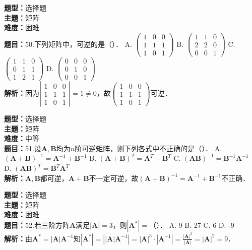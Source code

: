 \documentclass{ctexart}
\newenvironment{question}[5]{%
	\noindent\textbf{题型：}#1\\
	\textbf{主题：}#2\\
	\textbf{难度：}#3\\
	\textbf{题目：}#4\\
	\textbf{解析：}#5\\
	\vspace{1em}
}{}
\begin{document}
	\begin{question}
		{选择题}
		{矩阵}
		{困难}
		{50.下列矩阵中，可逆的是（）．
			A. \(\left(\begin{array}{lll}1 & 0 & 0 \\ 1 & 1 & 1 \\ 1 & 0 & 1\end{array}\right)\)
			B. \(\left(\begin{array}{lll}1 & 1 & 0 \\ 2 & 2 & 0 \\ 0 & 0 & 1\end{array}\right)\)
			C. \(\left(\begin{array}{lll}1 & 1 & 0 \\ 0 & 1 & 1 \\ 1 & 2 & 1\end{array}\right)\)
			D. \(\left(\begin{array}{lll}0 & 0 & 0 \\ 0 & 1 & 0 \\ 0 & 0 & 1\end{array}\right)\)}
		{因为\(\left|\begin{array}{lll}1 & 0 & 0 \\ 1 & 1 & 1 \\ 1 & 0 & 1\end{array}\right|=1 \neq 0\)，故\(\left(\begin{array}{lll}1 & 0 & 0 \\ 1 & 1 & 1 \\ 1 & 0 & 1\end{array}\right)\)可逆．}
	\end{question}
	
	\begin{question}
		{选择题}
		{矩阵}
		{中等}
		{51.设\(\mathbf{A}, \mathbf{B}\)均为\(n\)阶可逆矩阵，则下列各式中不正确的是（）．
			A. \((\mathbf{A}+\mathbf{B})^{-1}=\mathbf{A}^{-1}+\mathbf{B}^{-1}\)
			B. \((\mathbf{A}+\mathbf{B})^T=\mathbf{A}^T+\mathbf{B}^T\)
			C. \((\mathbf{A B})^{-1}=\mathbf{B}^{-1} \mathbf{A}^{-1}\)
			D. \((\mathbf{A B})^T=\mathbf{B}^T \mathbf{A}^T\)}
		{\(\mathbf{A}, \mathbf{B}\)都可逆，\(\mathbf{A}+\mathbf{B}\)不一定可逆，故\((\mathbf{A}+\mathbf{B})^{-1}=\mathbf{A}^{-1}+\mathbf{B}^{-1}\)不正确．}
	\end{question}
	
	\begin{question}
		{选择题}
		{矩阵}
		{困难}
		{52.若三阶方阵\(\mathbf{A}\)满足\(|\mathbf{A}|=3\)，则\(\left|\mathbf{A}^*\right|=\)（）．
			A. 9
			B. 27
			C. 6
			D. -9}
		{由\(\mathbf{A}^*=|\mathbf{A}| \mathbf{A}^{-1}\)知\(\left|\mathbf{A}^*\right|=\left||\mathbf{A}| \mathbf{A}^{-1}\right|=|\mathbf{A}|^3 \cdot\left|\mathbf{A}^{-1}\right|=\frac{|\mathbf{A}|^3}{|\mathbf{A}|}=|\mathbf{A}|^2=9\)．}
	\end{question}
	
\end{document}
